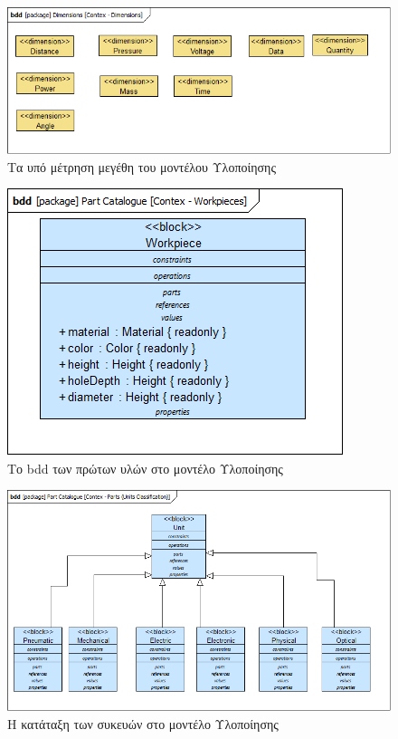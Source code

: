 \documentclass[a4paper,12pt,twoside]{report}
\begin{document}
\begin{appendices}
				\begin{figure}[hp]
					\centering
					\includegraphics[scale=0.50]{DesignModel_Contex-Dimensions.png}
					\caption{Τα υπό μέτρηση μεγέθη του μοντέλου Υλοποίησης}
					\label{φωτ:Τα υπό μέτρηση μεγέθη του μοντέλου Υλοποίησης}
				\end{figure}
				
				\begin{figure}[hp]
					\centering
					\includegraphics[scale=0.50]{DesignModel_Contex-Workpieces.png}
					\caption{Το bdd των πρώτων υλών στο μοντέλο Υλοποίησης}
					\label{φωτ:Το bdd των πρώτων υλών στο μοντέλο Υλοποίησης}
				\end{figure}
				
				\begin{figure}[hp]
					\centering
					\includegraphics[scale=0.50]{DesignModel_Contex-Parts(UnitsClassification).png}
					\caption{Η κατάταξη των συκευών στο μοντέλο Υλοποίησης}
					\label{φωτ:Η κατάταξη των συκευών στο μοντέλο Υλοποίησης}
				\end{figure}
				

\end{appendices}
\end{document}
